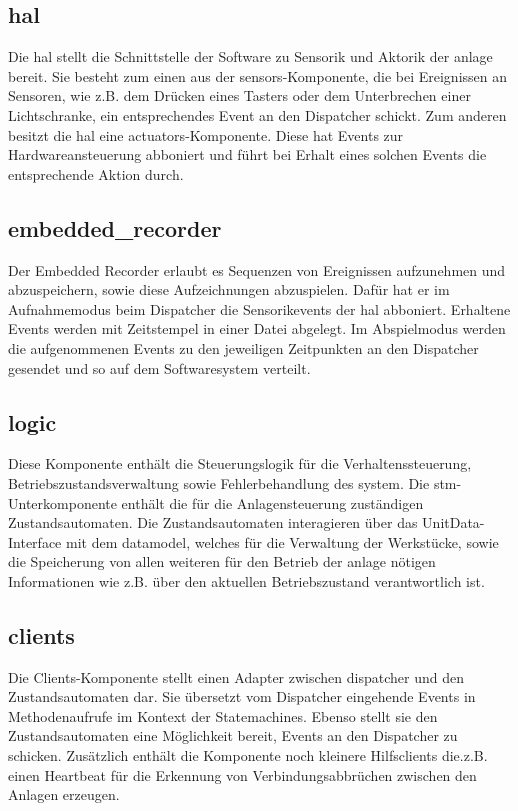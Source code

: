 \subsection{hal}\label{subsec:hal}
Die hal stellt die Schnittstelle der Software zu Sensorik und Aktorik der \gls{anlage} bereit.
Sie besteht zum einen aus der sensors-Komponente, die bei Ereignissen an Sensoren, wie z.B.
dem Drücken eines Tasters oder dem Unterbrechen einer Lichtschranke,
ein entsprechendes Event an den Dispatcher schickt.
Zum anderen besitzt die hal eine actuators-Komponente.
Diese hat Events zur Hardwareansteuerung abboniert und führt bei Erhalt eines solchen Events die entsprechende Aktion durch.

\subsection{embedded\_recorder}\label{subsec:embedded_recorder}
Der Embedded Recorder erlaubt es Sequenzen von Ereignissen aufzunehmen und abzuspeichern, sowie diese Aufzeichnungen abzuspielen.
Dafür hat er im Aufnahmemodus beim Dispatcher die Sensorikevents der hal abboniert.
Erhaltene Events werden mit Zeitstempel in einer Datei abgelegt.
Im Abspielmodus werden die aufgenommenen Events zu den jeweiligen Zeitpunkten an den Dispatcher gesendet und so auf dem Softwaresystem verteilt.

\subsection{logic}\label{subsec:logic}
Diese Komponente enthält die Steuerungslogik für die Verhaltenssteuerung, Betriebszustandsverwaltung sowie Fehlerbehandlung des \gls{system}.
Die stm-Unterkomponente enthält die für die Anlagensteuerung zuständigen Zustandsautomaten. Die Zustandsautomaten interagieren über das
UnitData-Interface mit dem datamodel, welches für die Verwaltung der Werkstücke, sowie die Speicherung von allen weiteren für den Betrieb der \gls{anlage} nötigen
Informationen wie z.B. über den aktuellen Betriebszustand verantwortlich ist.

\subsection{clients}\label{subsec:clients}
Die Clients-Komponente stellt einen Adapter zwischen dispatcher und den Zustandsautomaten dar.
Sie übersetzt vom Dispatcher eingehende Events in Methodenaufrufe im Kontext der Statemachines.
Ebenso stellt sie den Zustandsautomaten eine Möglichkeit bereit, Events an den Dispatcher zu schicken.
Zusätzlich enthält die Komponente noch kleinere Hilfsclients die.z.B. einen Heartbeat für die Erkennung
von Verbindungsabbrüchen zwischen den Anlagen erzeugen.

